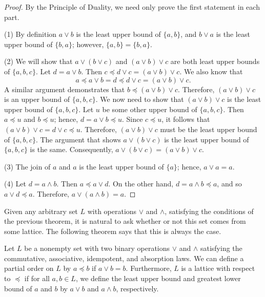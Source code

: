  
\begin{proof}
By the Principle
of Duality, we need only prove the first statement in each part. 
 
 
(1)  
By definition $a \vee b$ is the least upper bound of $\{ a, b\}$, and
$b \vee a$ is the least upper bound of $\{ b, a \}$; however, $\{ a, b\} 
= \{ b, a \}$.
 
 
(2)
We will show that $a \vee ( b \vee c)$ and $(a \vee b) \vee c$
are both least upper bounds of $\{ a, b, c \}$.	 Let $d =  a \vee b$.
Then $c \preceq  d \vee c = (a \vee b) \vee c$. We also know that 
$$
a \preceq  a \vee b =d \preceq  d \vee c = (a \vee b) \vee c.
$$
A similar argument demonstrates that $b \preceq (a \vee b) \vee c$.
Therefore, $(a \vee b) \vee c$ is an upper bound of $\{ a, b, c \}$.
We now need to show that $(a \vee b) \vee c$ is the least upper bound
of $\{ a, b, c\}$. Let $u$ be some other upper bound of $\{ a, b, c \}$. 
Then $a \preceq u$ and $b \preceq u$; hence, $d = a \vee b \preceq u$.
Since $c \preceq u$, it follows that $(a \vee b) \vee c = d \vee c
\preceq u$. Therefore, $(a \vee b) \vee c$ must be the least upper 
bound of $\{ a, b, c\}$. The argument that shows  $a \vee ( b \vee c)$ 
is the least upper bound of $\{ a, b, c \}$ is the same.  Consequently,
$a \vee ( b \vee c) = (a \vee b) \vee c$.
 
 
(3)
The join of $a$ and $a$ is the least upper bound of $\{ a \}$; hence,
$a \vee a = a$.
 
 
(4)
Let $d = a \wedge b$. Then $a \preceq a \vee d$.  On the other hand,
$d = a \wedge b \preceq a$, and so $a \vee d \preceq a$.  Therefore,
$a \vee ( a \wedge b) = a$.
\end{proof}
 
 
\medskip
 
 
Given any arbitrary set $L$ with operations $\vee$ and $\wedge$, 
satisfying the conditions of the previous theorem, it is natural
to ask whether or not this set comes from some lattice.  The
following theorem says that this is always the case.
 
 
\begin{theorem}
Let $L$ be a nonempty set with two binary operations $\vee$ and
$\wedge$ satisfying the commutative, associative, idempotent, and  
absorption laws.  We can define a partial order on $L$ by  $a \preceq
b$ if $a \vee b = b$. Furthermore, $L$ is a lattice with respect 
to $\preceq$ if for all $a, b \in L$, we define the least upper bound
and greatest lower bound of $a$ and $b$ by $a \vee b$ and $a \wedge
b$, respectively.
\end{theorem}
 
